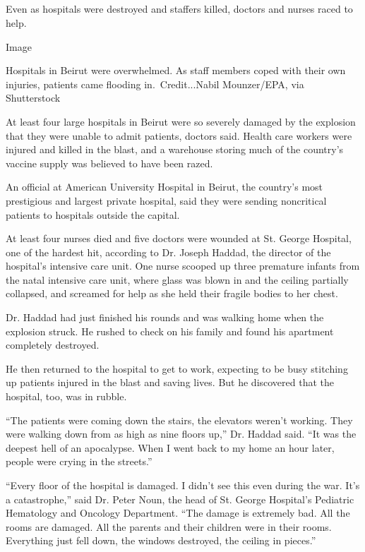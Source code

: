 \hypertarget{-1}{%
\subsection{}\label{-1}}

Even as hospitals were destroyed and staffers killed, doctors and nurses
raced to help.

Image

Hospitals in Beirut were overwhelmed. As staff members coped with their
own injuries, patients came flooding in.~Credit...Nabil Mounzer/EPA, via
Shutterstock

At least four large hospitals in Beirut were so severely damaged by the
explosion that they were unable to admit patients, doctors said. Health
care workers were injured and killed in the blast, and a warehouse
storing much of the country's vaccine supply was believed to have been
razed.

An official at American University Hospital in Beirut, the country's
most prestigious and largest private hospital, said they were sending
noncritical patients to hospitals outside the capital.

At least four nurses died and five doctors were wounded at St. George
Hospital, one of the hardest hit, according to Dr. Joseph Haddad, the
director of the hospital's intensive care unit. One nurse scooped up
three premature infants from the natal intensive care unit, where glass
was blown in and the ceiling partially collapsed, and screamed for help
as she held their fragile bodies to her chest.

Dr. Haddad had just finished his rounds and was walking home when the
explosion struck. He rushed to check on his family and found his
apartment completely destroyed.

He then returned to the hospital to get to work, expecting to be busy
stitching up patients injured in the blast and saving lives. But he
discovered that the hospital, too, was in rubble.

``The patients were coming down the stairs, the elevators weren't
working. They were walking down from as high as nine floors up,'' Dr.
Haddad said. ``It was the deepest hell of an apocalypse. When I went
back to my home an hour later, people were crying in the streets.''

``Every floor of the hospital is damaged. I didn't see this even during
the war. It's a catastrophe,'' said Dr. Peter Noun, the head of St.
George Hospital's Pediatric Hematology and Oncology Department. ``The
damage is extremely bad. All the rooms are damaged. All the parents and
their children were in their rooms. Everything just fell down, the
windows destroyed, the ceiling in pieces.''

